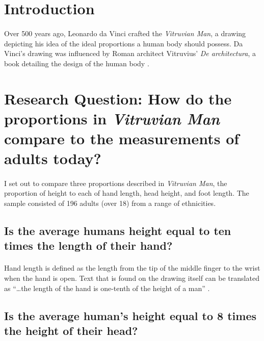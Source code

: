 \documentclass[]{article}
\begin{document}
\noindent  

\section{Introduction}
\label{sec:intro}

\paragraph{}

Over 500 years ago, Leonardo da Vinci crafted the \emph{Vitruvian Man},
a drawing depicting his idea of the ideal proportions a human body
should possess. Da Vinci's drawing was influenced by Roman architect
Vitruvius' \emph{De architectura}, a book detailing the design of the
human body \citep{Wikipedia:Vitruvian}.

\section{Research Question: How do the proportions in \emph{Vitruvian Man} compare to the measurements of adults today?}
\label{sec:rq}

\paragraph{}

I set out to compare three proportions described in
\emph{Vitruvian Man}, the proportion of height to each of hand length,
head height, and foot length. The sample consisted of 196 adults (over
18) from a range of ethnicities.

\subsection{Is the average humans height equal to ten times the length of their hand?}
\paragraph{}

Hand length is defined as the length from the tip of the middle finger
to the wrist when the hand is open. Text that is found on the drawing
itself can be translated as ``\ldots the length of the hand is one-tenth
of the height of a man'' \citep{Wikipedia:Vitruvian}. \label{sec:rq2}

\subsection{Is the average human's height equal to 8 times the height of their head?}
\label{sec:rq3}
\end{document}
